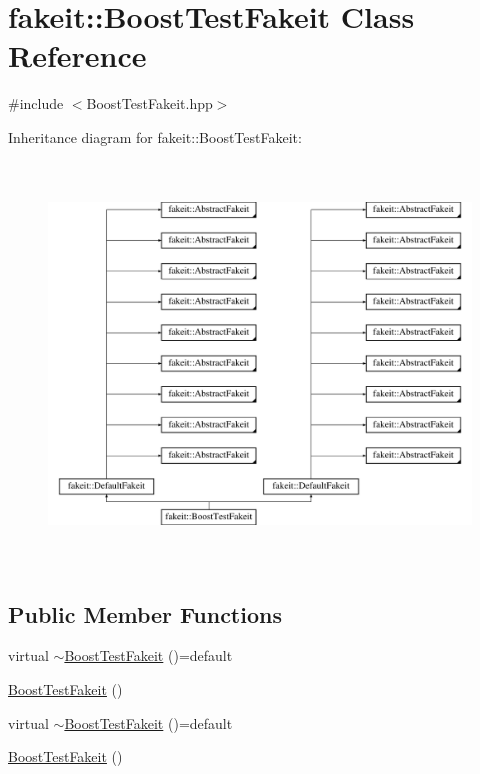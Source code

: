 \hypertarget{classfakeit_1_1BoostTestFakeit}{}\section{fakeit\+::Boost\+Test\+Fakeit Class Reference}
\label{classfakeit_1_1BoostTestFakeit}


{\ttfamily \#include $<$Boost\+Test\+Fakeit.\+hpp$>$}

Inheritance diagram for fakeit\+::Boost\+Test\+Fakeit\+:\begin{figure}[H]
\begin{center}
\leavevmode
\includegraphics[height=10.694445cm]{classfakeit_1_1BoostTestFakeit}
\end{center}
\end{figure}
\subsection*{Public Member Functions}
\begin{DoxyCompactItemize}
\item 
virtual \mbox{\hyperlink{classfakeit_1_1BoostTestFakeit_a5d878b1b242b7edbbf95deced18e9707}{$\sim$\+Boost\+Test\+Fakeit}} ()=default
\item 
\mbox{\hyperlink{classfakeit_1_1BoostTestFakeit_a71e8bfc49cc6960a91d3d63421a0e362}{Boost\+Test\+Fakeit}} ()
\item 
virtual \mbox{\hyperlink{classfakeit_1_1BoostTestFakeit_a5d878b1b242b7edbbf95deced18e9707}{$\sim$\+Boost\+Test\+Fakeit}} ()=default
\item 
\mbox{\hyperlink{classfakeit_1_1BoostTestFakeit_a71e8bfc49cc6960a91d3d63421a0e362}{Boost\+Test\+Fakeit}} ()
\end{DoxyCompactItemize}
